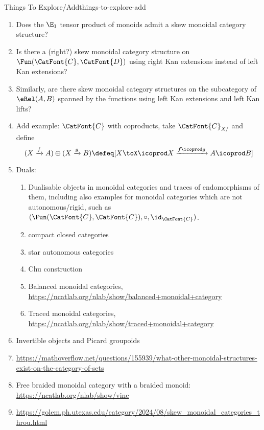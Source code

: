 \begin{remark}{Things To Explore/Add}{things-to-explore-add}
\begin{enumerate}
        \item Does the $\E_{1}$ tensor product of monoids admit a skew monoidal category structure?
        \item Is there a (right?) skew monoidal category structure on $\Fun(\CatFont{C},\CatFont{D})$ using right Kan extensions instead of left Kan extensions?
        \item Similarly, are there skew monoidal category structures on the subcategory of $\eRel(A,B)$ spanned by the functions using left Kan extensions and left Kan lifts?
        \item Add example: $\CatFont{C}$ with coproducts, take $\CatFont{C}_{X/}$ and define
            \[
                (X\xrightarrow{f}A)\oplus(X\xrightarrow{g}B)%
                \defeq%
                [%
                    X%
                    \to%
                    X\icoprod X%
                    \xrightarrow{f\icoprod g}%
                    A\icoprod B%
                ]%
            \]%
        \item Duals:
            \begin{enumerate}
                \item Dualisable objects in monoidal categories and traces of endomorphisms of them, including also examples for monoidal categories which are not autonomous/rigid, such as $(\Fun(\CatFont{C},\CatFont{C}),\circ,\id_{\CatFont{C}})$.
                \item compact closed categories
                \item star autonomous categories
                \item Chu construction
                \item Balanced monoidal categories, \url{https://ncatlab.org/nlab/show/balanced+monoidal+category}
                \item Traced monoidal categories, \url{https://ncatlab.org/nlab/show/traced+monoidal+category}
            \end{enumerate}
        \item Invertible objects and Picard groupoids
        \item \url{https://mathoverflow.net/questions/155939/what-other-monoidal-structures-exist-on-the-category-of-sets}
        \item Free braided monoidal category with a braided monoid: \url{https://ncatlab.org/nlab/show/vine}
        \item \url{https://golem.ph.utexas.edu/category/2024/08/skew_monoidal_categories_throu.html}

\end{enumerate}
\end{remark}
